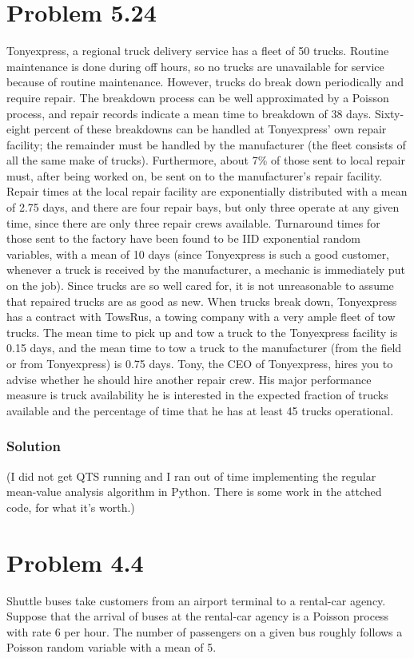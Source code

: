 \documentclass[letterpaper]{amsart}
\begin{document}
\section{Problem 5.24} %
Tonyexpress, a regional truck delivery service has a fleet of 50 trucks.
Routine maintenance is done during off hours, so no trucks are unavailable
for service because of routine maintenance. However, trucks do break
down periodically and require repair. The breakdown process can be well
approximated by a Poisson process, and repair records indicate a mean
time to breakdown of 38 days. Sixty-eight percent of these breakdowns
can be handled at Tonyexpress’ own repair facility; the remainder must be
handled by the manufacturer (the fleet consists of all the same make of
trucks). Furthermore, about 7\% of those sent to local repair must, after
being worked on, be sent on to the manufacturer’s repair facility. Repair
times at the local repair facility are exponentially distributed with a mean
of 2.75 days, and there are four repair bays, but only three operate at any
given time, since there are only three repair crews available. Turnaround
times for those sent to the factory have been found to be IID exponential
random variables, with a mean of 10 days (since Tonyexpress is such a good
customer, whenever a truck is received by the manufacturer, a mechanic
is immediately put on the job). Since trucks are so well cared for, it is
not unreasonable to assume that repaired trucks are as good as new. When
trucks break down, Tonyexpress has a contract with TowsRus, a towing
company with a very ample fleet of tow trucks. The mean time to pick up
and tow a truck to the Tonyexpress facility is 0.15 days, and the mean time
to tow a truck to the manufacturer (from the field or from Tonyexpress) is
0.75 days. Tony, the CEO of Tonyexpress, hires you to advise whether he
should hire another repair crew. His major performance measure is truck
availability he is interested in the expected fraction of trucks available and
the percentage of time that he has at least 45 trucks operational.
\subsubsection*{Solution}
(I did not get QTS running and I ran out of time implementing the regular
mean-value analysis algorithm in Python. There is some work in the attched code,
for what it's worth.)


\section{Problem 4.4} %
Shuttle buses take customers from an airport terminal to a rental-car agency.
Suppose that the arrival of buses at the rental-car agency is a Poisson process
with rate 6 per hour. The number of passengers on a given bus roughly
follows a Poisson random variable with a mean of 5.
\end{document}
